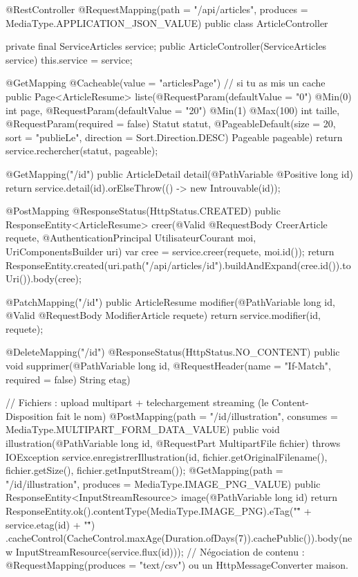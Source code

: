 \begin{codejava}
@RestController
@RequestMapping(path = "/api/articles", produces = MediaType.APPLICATION_JSON_VALUE)
public class ArticleController {
    private final ServiceArticles service;
    public ArticleController(ServiceArticles service) { this.service = service; }

    @GetMapping
    @Cacheable(value = "articlesPage")                       // si tu as mis un cache
    public Page<ArticleResume> liste(@RequestParam(defaultValue = "0") @Min(0) int page,
                                     @RequestParam(defaultValue = "20") @Min(1) @Max(100) int taille,
                                     @RequestParam(required = false) Statut statut,
                                     @PageableDefault(size = 20, sort = "publieLe", direction = Sort.Direction.DESC)
                                     Pageable pageable) {
        return service.rechercher(statut, pageable);
    }

    @GetMapping("/{id}")
    public ArticleDetail detail(@PathVariable @Positive long id) { return service.detail(id).orElseThrow(() -> new Introuvable(id)); }

    @PostMapping
    @ResponseStatus(HttpStatus.CREATED)
    public ResponseEntity<ArticleResume> creer(@Valid @RequestBody CreerArticle requete,
                                               @AuthenticationPrincipal UtilisateurCourant moi,
                                               UriComponentsBuilder uri) {
        var cree = service.creer(requete, moi.id());
        return ResponseEntity.created(uri.path("/api/articles/{id}").buildAndExpand(cree.id()).toUri()).body(cree);
    }

    @PatchMapping("/{id}")
    public ArticleResume modifier(@PathVariable long id, @Valid @RequestBody ModifierArticle requete) { return service.modifier(id, requete); }

    @DeleteMapping("/{id}")
    @ResponseStatus(HttpStatus.NO_CONTENT)
    public void supprimer(@PathVariable long id, @RequestHeader(name = "If-Match", required = false) String etag) { }

    // Fichiers : upload multipart + telechargement streaming (le Content-Disposition fait le nom)
    @PostMapping(path = "/{id}/illustration", consumes = MediaType.MULTIPART_FORM_DATA_VALUE)
    public void illustration(@PathVariable long id, @RequestPart MultipartFile fichier) throws IOException {
        service.enregistrerIllustration(id, fichier.getOriginalFilename(), fichier.getSize(), fichier.getInputStream());
    }
    @GetMapping(path = "/{id}/illustration", produces = MediaType.IMAGE_PNG_VALUE)
    public ResponseEntity<InputStreamResource> image(@PathVariable long id) {
        return ResponseEntity.ok().contentType(MediaType.IMAGE_PNG).eTag("\"" + service.etag(id) + "\"")
                .cacheControl(CacheControl.maxAge(Duration.ofDays(7)).cachePublic()).body(new InputStreamResource(service.flux(id)));
    }
    // N\'egociation de contenu : @RequestMapping(produces = "text/csv") ou un HttpMessageConverter maison.
}


\end{codejava}

